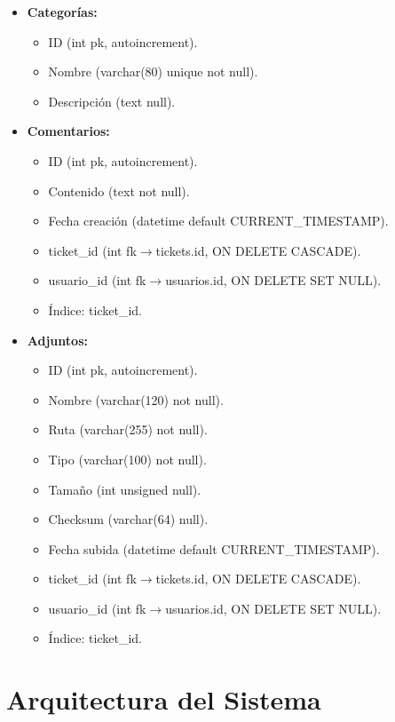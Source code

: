 \documentclass[12pt,a4paper]{article}
\begin{document}
\begin{itemize}
    \item \textbf{Categorías:}
    \begin{itemize}[left=1.5em,nosep]
        \item ID (int pk, autoincrement).
        \item Nombre (varchar(80) unique not null).
        \item Descripción (text null).
    \end{itemize}

    \item \textbf{Comentarios:}
    \begin{itemize}[left=1.5em,nosep]
        \item ID (int pk, autoincrement).
        \item Contenido (text not null).
        \item Fecha creación (datetime default CURRENT\_TIMESTAMP).
        \item ticket\_id (int fk$\rightarrow$tickets.id, ON DELETE CASCADE).
        \item usuario\_id (int fk$\rightarrow$usuarios.id, ON DELETE SET NULL).
        \item Índice: ticket\_id.
    \end{itemize}

    \item \textbf{Adjuntos:}
    \begin{itemize}[left=1.5em,nosep]
        \item ID (int pk, autoincrement).
        \item Nombre (varchar(120) not null).
        \item Ruta (varchar(255) not null).
        \item Tipo (varchar(100) not null).
        \item Tamaño (int unsigned null).
        \item Checksum (varchar(64) null).
        \item Fecha subida (datetime default CURRENT\_TIMESTAMP).
        \item ticket\_id (int fk$\rightarrow$tickets.id, ON DELETE CASCADE).
        \item usuario\_id (int fk$\rightarrow$usuarios.id, ON DELETE SET NULL).
        \item Índice: ticket\_id.
    \end{itemize}
\end{itemize}

\section{Arquitectura del Sistema}
\end{document}

